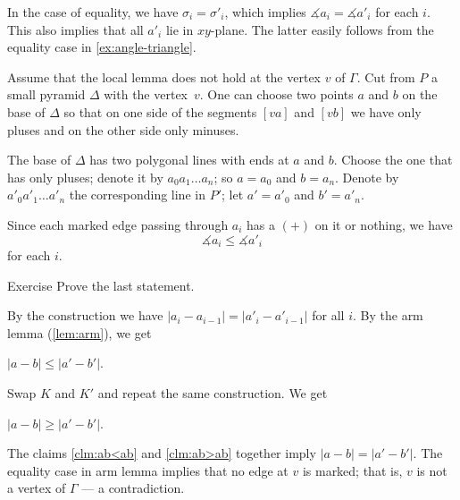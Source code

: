 In the case of equality, we have $\sigma_i=\sigma'_i$,
which implies $\measuredangle a_i=\measuredangle a'_i$ for each $i$.
This also implies that all $a'_i$ lie in $xy$-plane.
The latter easily follows from the equality case in \ref{ex:angle-triangle}.
\qeds
 
Assume that the local lemma does not hold at the vertex $v$ of $\Gamma$.
Cut from $P$ a small pyramid $\Delta$ with the vertex~$v$.
One can choose two points $a$ and $b$ on the base of $\Delta$
so that on one side of the segments $[va]$ and $[vb]$ we have only pluses
and on the other side only minuses.


The base of $\Delta$ has two polygonal lines with ends at $a$ and $b$.
Choose the one that has only pluses;
denote it by $a_0 a_1 \dots a_n$;
so $a=a_0$ and $b=a_n$.
Denote by $a'_0 a'_1 \dots a'_n$
the corresponding line in $P'$;
let $a'=a'_0$ and $b'=a'_n$.

Since each marked edge passing through $a_i$ has a $(+)$ on it or nothing, 
we have $$\measuredangle a_i\le\measuredangle a'_i$$
for each $i$.
\begin{thm}{Exercise}
Prove the last statement. 
\end{thm}
By the construction we have $|a_i-a_{i-1}|=|a'_i-a'_{i-1}|$ for all $i$.
By the arm lemma (\ref{lem:arm}), 
we get 
\begin{clm}{}\label{clm:ab<ab}
$|a-b|\le |a'-b'|$.
\end{clm}
Swap $K$ and $K'$ and repeat the same construction.
We get
\begin{clm}{}\label{clm:ab>ab}
$|a-b|\ge |a'-b'|$.
\end{clm}

The claims 
\ref{clm:ab<ab} and \ref{clm:ab>ab} 
together imply $|a-b|=|a'-b'|$.
The equality case in arm lemma implies that no edge at $v$ is marked;
that is, $v$ is not a vertex of $\Gamma$
--- a contradiction.
\qeds

